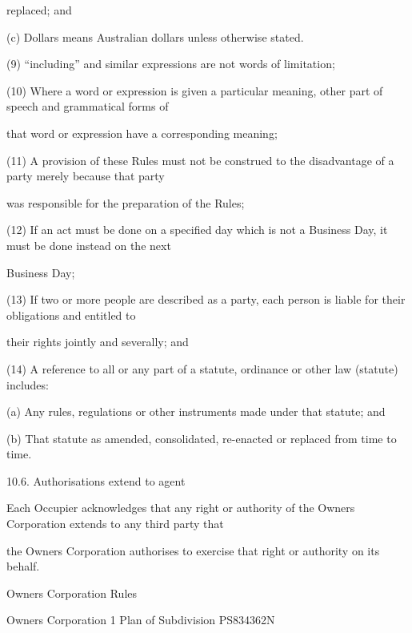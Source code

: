 \documentclass{article}
\begin{document}
{\fontsize{10.02}{1}replaced; and }

{\fontsize{9.962}{1}(c) Dollars means Australian dollars unless otherwise stated. }

{\fontsize{9.962}{1}(9) “including” and similar expressions are not words of limitation; }

{\fontsize{9.962}{1}(10) Where a word or expression is given a particular meaning, other part of speech and grammatical forms of }

{\fontsize{10.02}{1}that word or expression have a corresponding meaning; }

{\fontsize{9.962}{1}(11) A provision of these Rules must not be construed to the disadvantage of a party merely because that party }

{\fontsize{10.02}{1}was responsible for the preparation of the Rules; }

{\fontsize{9.962}{1}(12) If an act must be done on a specified day which is not a Business Day, it must be done instead on the next }

{\fontsize{10.02}{1}Business Day; }

{\fontsize{9.962}{1}(13) If two or more people are described as a party, each person is liable for their obligations and entitled to }

{\fontsize{10.02}{1}their rights jointly and severally; and }

{\fontsize{9.962}{1}(14) A reference to all or any part of a statute, ordinance or other law (statute) includes: }

{\fontsize{9.962}{1}(a) Any rules, regulations or other instruments made under that statute; and }

{\fontsize{9.962}{1}(b) That statute as amended, consolidated, re-enacted or replaced from time to time. }

{\fontsize{9.99}{1}10.6. Authorisations extend to agent }

{\fontsize{10.02}{1}Each Occupier acknowledges that any right or authority of the Owners Corporation extends to any third party that }

{\fontsize{10.02}{1}the Owners Corporation authorises to exercise that right or authority on its behalf. }

\newpage





{\fontsize{9}{1}Owners Corporation Rules }

{\fontsize{9}{1}Owners Corporation 1 Plan of Subdivision PS834362N }
\end{document}
